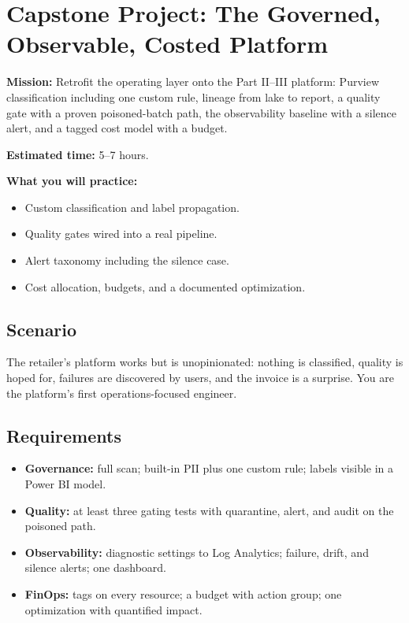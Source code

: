 \section{Capstone Project: The Governed, Observable, Costed Platform}\label{sec:ch22-capstone}

\begin{capstonebox}
\textbf{Mission:} Retrofit the operating layer onto the Part II--III platform: Purview classification including one custom rule, lineage from lake to report, a quality gate with a proven poisoned-batch path, the observability baseline with a silence alert, and a tagged cost model with a budget.

\textbf{Estimated time:} 5--7 hours.

\textbf{What you will practice:}
\begin{itemize}
    \item Custom classification and label propagation.
    \item Quality gates wired into a real pipeline.
    \item Alert taxonomy including the silence case.
    \item Cost allocation, budgets, and a documented optimization.
\end{itemize}
\end{capstonebox}

\subsection*{Scenario}
The retailer's platform works but is unopinionated: nothing is classified, quality is hoped for, failures are discovered by users, and the invoice is a surprise. You are the platform's first operations-focused engineer.

\subsection*{Requirements}
\begin{itemize}
    \item \textbf{Governance:} full scan; built-in PII plus one custom rule; labels visible in a Power BI model.
    \item \textbf{Quality:} at least three gating tests with quarantine, alert, and audit on the poisoned path.
    \item \textbf{Observability:} diagnostic settings to Log Analytics; failure, drift, and silence alerts; one dashboard.
    \item \textbf{FinOps:} tags on every resource; a budget with action group; one optimization with quantified impact.
\end{itemize}

